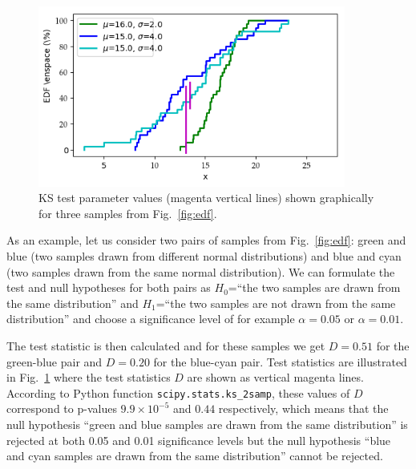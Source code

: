 \documentclass[english, oneside]{HYgradu}
\begin{document}
\begin{figure}
   \centering
   \includegraphics[width=0.9\textwidth]{kuvat/kstest.png}
   \caption{KS test parameter values (magenta vertical lines) shown graphically for three samples from Fig.\ \ref{fig:edf}.}
   \label{fig:ks} 
\end{figure}

As an example, let us consider two pairs of samples from Fig.\ \ref{fig:edf}: green and blue (two samples drawn from different normal distributions) and blue and cyan (two samples drawn from the same normal distribution). We can formulate the test and null hypotheses for both pairs as $H_0$=``the two samples are drawn from the same distribution'' and $H_1$=``the two samples are not drawn from the same distribution'' and choose a significance level of for example $\alpha=0.05$ or $\alpha=0.01$.

The test statistic is then calculated and for these samples we get $D=0.51$ for the green-blue pair and $D=0.20$ for the blue-cyan pair. Test statistics are illustrated in Fig.\ \ref{fig:ks} where the test statistics $D$ are shown as vertical magenta lines. According to Python function \texttt{scipy.stats.ks\_2samp}, these values of $D$ correspond to p-values $9.9\times 10^{-5}$ and $0.44$ respectively, which means that the null hypothesis ``green and blue samples are drawn from the same distribution'' is rejected at both 0.05 and 0.01 significance levels but the null hypothesis ``blue and cyan samples are drawn from the same distribution'' cannot be rejected.
\end{document}
